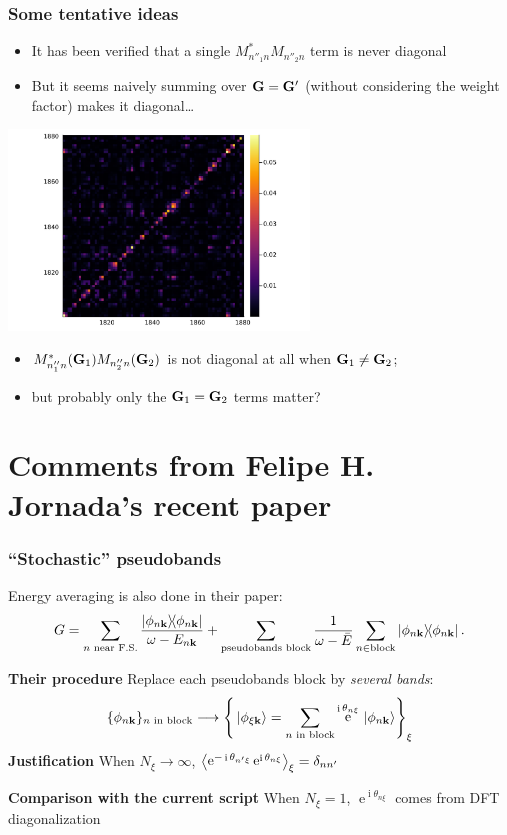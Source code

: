 \documentclass[t,aspectratio=169]{beamer}
\DeclareMathOperator{\ee}{e}
\DeclareMathOperator{\ii}{i}
\begin{document}
\begin{frame}[allowframebreaks]
\frametitle{Some tentative ideas}

\begin{itemize}
    \item It has been verified that a single $M_{n''_1 n}^* M_{n''_2 n}$ term is never diagonal
    \item But it seems naively summing over $\vb{G} = \vb{G}'$ (without considering the weight factor)
    makes it diagonal\dots
\end{itemize}    

\begin{center}
    \includegraphics[width=0.6\textwidth]{../data/sigma/nc_range-1800-1880-n_idx-119-n_prime_idx_119-k_idx-1-q_idx-1-G_range-800-900.png}
\end{center}

\begin{itemize}
    \item $M_{n''_1 n}^*(\vb{G}_1) M_{n''_2 n}(\vb{G}_2)$ is not diagonal at all when $\vb{G}_1 \neq \vb{G}_2$; 
    \item but probably only the $\vb{G}_1 = \vb{G}_2$ terms matter?
\end{itemize}

\end{frame}

\section{Comments from Felipe H. Jornada's recent paper}

\begin{frame}
\frametitle{``Stochastic'' pseudobands}

Energy averaging is also done in their paper:
\[
    G = \sum_{\text{$n$ near F.S.}} \frac{\dyad{\phi_{n \vb{k}}}}{\omega - E_{n \vb{k}}} + \sum_{\text{pseudobands block}} \frac{1}{\omega - \bar{E}} \sum_{n \in \text{block}} \dyad{\phi_{n \vb{k}}}.
\]     

\textbf{Their procedure} Replace each pseudobands block by \emph{several bands}:
\[
    \{\phi_{n \vb{k}}\}_{\text{$n$ in block}} \longrightarrow
    \left\{
        \ket*{\phi_{\xi \vb{k}}} = \sum_{\text{$n$ in block}} 
        \ee^{\ii \theta_{n \xi}} \ket*{\phi_{n \vb{k}}}
    \right\}_\xi
\]
\textbf{Justification} When $N_\xi \to \infty$, 
$\expval{
    \ee^{- \ii \theta_{n' \xi}} \ee^{\ii \theta_{n \xi}}
}_\xi = \delta_{n n'}$

\textbf{Comparison with the current script} When $N_\xi = 1$, 
$\ee^{\ii \theta_{n \xi}}$ comes from DFT diagonalization

\end{frame}
\end{document}
